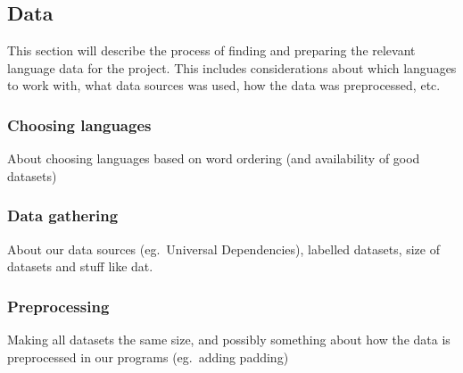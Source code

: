 

\subsection{Data}

This section will describe the process of finding and preparing the relevant
language data for the project. This includes considerations about which
languages to work with, what data sources was used, how the data was
preprocessed, etc.


\subsubsection{Choosing languages}

About choosing languages based on word ordering (and availability of good
datasets)


\subsubsection{Data gathering}

About our data sources (eg.\ Universal Dependencies), labelled datasets, size of
datasets and stuff like dat.


\subsubsection{Preprocessing}

Making all datasets the same size, and possibly something about how the data is
preprocessed in our programs (eg.\ adding padding)

